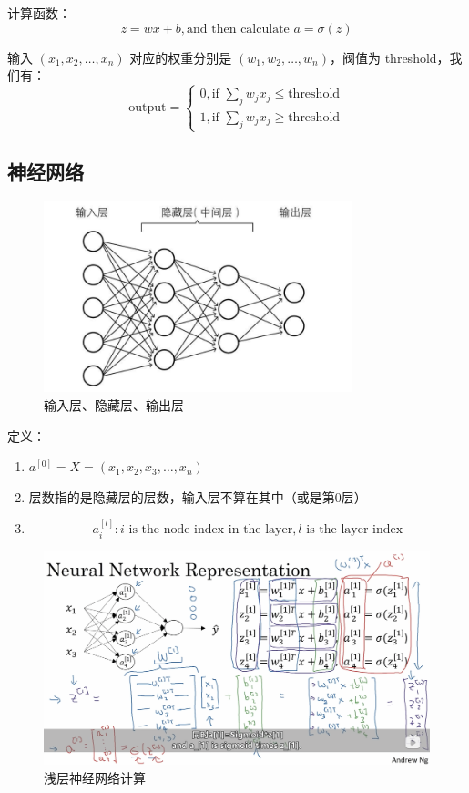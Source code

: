 \documentclass[cn,hazy,blue,11pt,normal]{elegantnote}
\begin{document}
计算函数：
\[
z = wx+b, \text{and then calculate } a = \sigma(z)
\]

输入 $(x_1,x_2,\ldots,x_n)$ 对应的权重分别是 $(w_1,w_2,\ldots,w_n)$，阀值为 threshold，我们有：
\[
    \text{output} = \begin{cases}
        0, \text{if } \sum_jw_jx_j \le \text{threshold} \\
        1, \text{if } \sum_jw_jx_j \ge \text{threshold}
    \end{cases}
\]

\subsection{神经网络}

\begin{figure}[H] %
    \centering
    \includegraphics[width=0.8\textwidth]{./fig/输入层、隐藏层、输出层.png}
    \caption{输入层、隐藏层、输出层}
    \label{fig:输入层-隐藏层-输出层}
\end{figure}

定义：
\begin{enumerate}
    \item $a^{[0]}= X = (x_1,x_2,x_3,\ldots,x_n)$
    \item 层数指的是隐藏层的层数，输入层不算在其中（或是第0层）
    \item
        \[
            a_i^{[l]}: i\text{ is the node index in the layer}, l\text{ is the layer index}
        \]
\end{enumerate}

\begin{figure}[H] %
    \centering
    \includegraphics[width=\textwidth]{./fig/浅层神经网络计算.png}
    \caption{浅层神经网络计算}
    \label{fig:浅层神经网络计算}
\end{figure}
\end{document}
